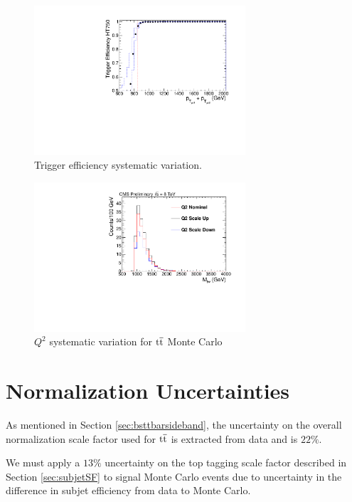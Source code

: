 \begin{figure}[htcb]
\begin{center}
\includegraphics[width=0.7\textwidth]{AN-14-049/figs/Trigger_Comparison_Htdijet_dataonly_withsyst}
\caption{
Trigger efficiency systematic variation. 
}
\label{figs:bsteffsys}
\end{center}
\end{figure}


\begin{figure}[htcb]
\begin{center}
\includegraphics[width=0.7\textwidth]{AN-14-049/figs/TTbar_Q2Scale}
\caption{
$Q^2$ systematic variation for $\mathrm{t\overline{t}}$ Monte Carlo 
}
\label{figs:bsq2scale}
\end{center}
\end{figure}


\section{Normalization Uncertainties}
As mentioned in Section \ref{sec:bsttbarsideband}, the uncertainty on the overall normalization scale factor used for $\mathrm{t\overline{t}}$ is extracted from data and is $22\%$.   

We must apply a $13\%$ uncertainty on the top tagging scale factor described in Section \ref{sec:subjetSF} 
to signal Monte Carlo events due to uncertainty in the difference in subjet efficiency from data to Monte Carlo.

